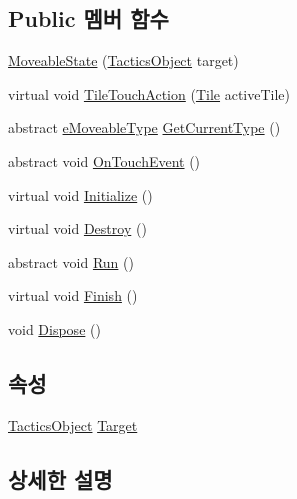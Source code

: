\subsection*{Public 멤버 함수}
\begin{DoxyCompactItemize}
\item 
\hyperlink{class_moveable_object_1_1_moveable_state_a623625a3835f3038d314023b95533944}{Moveable\+State} (\hyperlink{class_tactics_object}{Tactics\+Object} target)
\item 
virtual void \hyperlink{class_moveable_object_1_1_moveable_state_ad12f69b3ef4dadf43105502253b4dc6e}{Tile\+Touch\+Action} (\hyperlink{class_tile}{Tile} active\+Tile)
\item 
abstract \hyperlink{_moveable_object_8cs_a90215797ba850e199f3ef63d7c56f132}{e\+Moveable\+Type} \hyperlink{class_moveable_object_1_1_moveable_state_a2e4bcd7c2bac20c8a628d113292d2722}{Get\+Current\+Type} ()
\item 
abstract void \hyperlink{class_moveable_object_1_1_moveable_state_a2e9b847c28ea97d1aaca22ddeed3d0d7}{On\+Touch\+Event} ()
\item 
virtual void \hyperlink{class_m_c_n_1_1_state_a5be59bc891e64cbbe4322d74a6746908}{Initialize} ()
\item 
virtual void \hyperlink{class_m_c_n_1_1_state_aebf48ef248bbf185d6aae91d9789459e}{Destroy} ()
\item 
abstract void \hyperlink{class_m_c_n_1_1_state_afdec72a816a8a8ec584cac758a027215}{Run} ()
\item 
virtual void \hyperlink{class_m_c_n_1_1_state_a2492ca731678b8216c02134dddeeb745}{Finish} ()
\item 
void \hyperlink{class_m_c_n_1_1_state_af6df0477e0dead784489688cb2c2093e}{Dispose} ()
\end{DoxyCompactItemize}
\subsection*{속성}
\begin{DoxyCompactItemize}
\item 
\hyperlink{class_tactics_object}{Tactics\+Object} \hyperlink{class_m_c_n_1_1_state_a79a563b32f183c9adc9a96679fc57eb8}{Target}
\end{DoxyCompactItemize}


\subsection{상세한 설명}


